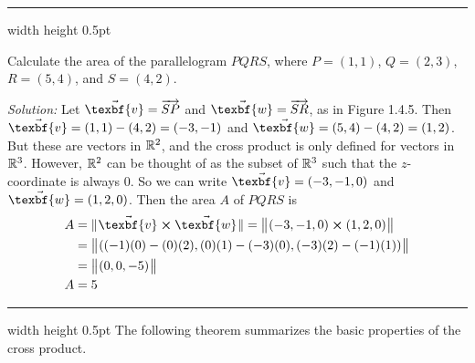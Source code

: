 \hrule width \textwidth height 0.5pt
\begin{exmp}
 Calculate the area of the parallelogram $PQRS$, where $P = (1,1)$, $Q = (2,3)$, $R = (5,4)$, and
 $S = (4,2)$.\vspace{1mm}
 \piccaption[]{}
 \par\noindent\emph{Solution:} Let $\vec{\texbf{v}} = \overrightarrow{SP}$ and $\vec{\texbf{w}} = \overrightarrow{SR}$, as in
 Figure 1.4.5. Then $\vec{\texbf{v}} = (1,1) - (4,2) = (-3,-1)$ and $\vec{\texbf{w}} = (5,4) - (4,2) = (1,2)$. But these are
 vectors in $\mathbb{R}^{2}$, and the cross product is only defined for vectors in $\mathbb{R}^{3}$. However, $\mathbb{R}^{2}$ can
 be thought of as the subset of $\mathbb{R}^{3}$ such that the $z$-coordinate is always $0$. So we can write
 $\vec{\texbf{v}} = (-3,-1,0)$ and $\vec{\texbf{w}} = (1,2,0)$. Then the area $A$ of $PQRS$ is
 \begin{align*}
 A &= \norm{\Crossprod{\vec{\texbf{v}}}{\vec{\texbf{w}}}} = \Norm{\Crossprod{(-3,-1,0)}{(1,2,0)}}\\
 &= \Norm{((-1)(0) - (0)(2), (0)(1) - (-3)(0), (-3)(2) - (-1)(1))}\\
 &= \Norm{(0,0, -5)}\\
 A &= 5
 \end{align*}
\end{exmp}
\hrule width \textwidth height 0.5pt
\newpage
The following theorem summarizes the basic properties of the cross product.

